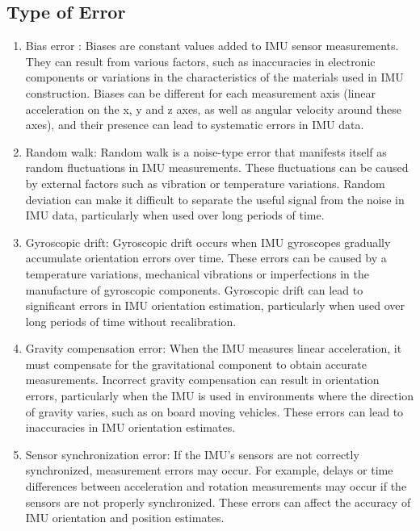 \subsection{Type of Error}

\begin{enumerate}
	
	\item Bias error : Biases are constant values added to IMU sensor measurements. They can result from various factors, such as inaccuracies in electronic components or variations in the characteristics of the materials used in IMU construction. Biases can be different for each measurement axis (linear acceleration on the x, y and z axes, as well as angular velocity around these axes), and their presence can lead to systematic errors in IMU data. \cite{hexagon_imu:2025}
	
	\item Random walk: Random walk is a noise-type error that manifests itself as random fluctuations in IMU measurements. These fluctuations can be caused by external factors such as vibration or temperature variations. Random deviation can make it difficult to separate the useful signal from the noise in IMU data, particularly when used over long periods of time. \cite{vectornav_random_walk:2025}
	
	\item Gyroscopic drift: Gyroscopic drift occurs when IMU gyroscopes gradually accumulate orientation errors over time. These errors can be caused by  a temperature variations, mechanical vibrations or imperfections in the manufacture of gyroscopic components. Gyroscopic drift can lead to significant errors in IMU orientation estimation, particularly when used over long periods of time without recalibration. \cite{electronics_gyro_drift:2025}
	
	\item Gravity compensation error: When the IMU measures linear acceleration, it must compensate for the gravitational component to obtain accurate measurements. Incorrect gravity compensation can result in orientation errors, particularly when the IMU is used in environments where the direction of gravity varies, such as on board moving vehicles. These errors can lead to inaccuracies in IMU orientation estimates. \cite{advanced_nav_gravity:2025}
	
	\item Sensor synchronization error: If the IMU's sensors are not correctly synchronized, measurement errors may occur. For example, delays or time differences between acceleration and rotation measurements may occur if the sensors are not properly synchronized. These errors can affect the accuracy of IMU orientation and position estimates. \cite{advanced_nav_gravity:2025}
	

\end{enumerate}

